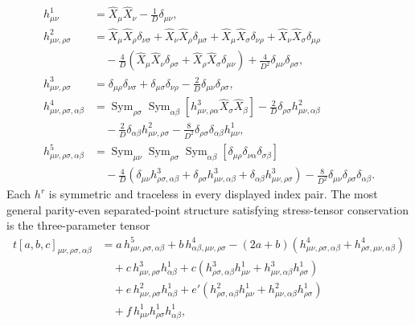 \begin{align}
  h^1_{\mu\nu}
  &=
  \widehat X_\mu\widehat X_\nu-\frac1D\delta_{\mu\nu},
  \nonumber\\
  h^2_{\mu\nu,\rho\sigma}
  &=
  \widehat X_\mu\widehat X_\rho\delta_{\nu\sigma}
  +\widehat X_\nu\widehat X_\rho\delta_{\mu\sigma}
  +\widehat X_\mu\widehat X_\sigma\delta_{\nu\rho}
  +\widehat X_\nu\widehat X_\sigma\delta_{\mu\rho}
  \nonumber\\
  &\quad
  -\frac4D
  \left(
    \widehat X_\mu\widehat X_\nu\delta_{\rho\sigma}
    +
    \widehat X_\rho\widehat X_\sigma\delta_{\mu\nu}
  \right)
  +
  \frac4{D^2}\delta_{\mu\nu}\delta_{\rho\sigma},
  \nonumber\\
  h^3_{\mu\nu,\rho\sigma}
  &=
  \delta_{\mu\rho}\delta_{\nu\sigma}
  +
  \delta_{\mu\sigma}\delta_{\nu\rho}
  -
  \frac2D\delta_{\mu\nu}\delta_{\rho\sigma},
  \nonumber\\
  h^4_{\mu\nu,\rho\sigma,\alpha\beta}
  &=
  \operatorname{Sym}_{\rho\sigma}
  \operatorname{Sym}_{\alpha\beta}
  \left[
    h^3_{\mu\nu,\rho\alpha}
    \widehat X_\sigma\widehat X_\beta
  \right]
  -
  \frac2D\delta_{\rho\sigma}h^2_{\mu\nu,\alpha\beta}
  \nonumber\\
  &\quad
  -
  \frac2D\delta_{\alpha\beta}h^2_{\mu\nu,\rho\sigma}
  -
  \frac8{D^2}\delta_{\rho\sigma}\delta_{\alpha\beta}h^1_{\mu\nu},
  \nonumber\\
  h^5_{\mu\nu,\rho\sigma,\alpha\beta}
  &=
  \operatorname{Sym}_{\mu\nu}
  \operatorname{Sym}_{\rho\sigma}
  \operatorname{Sym}_{\alpha\beta}
  \left[
    \delta_{\mu\rho}\delta_{\nu\alpha}\delta_{\sigma\beta}
  \right]
  \nonumber\\
  &\quad
  -
  \frac4D
  \left(
    \delta_{\mu\nu}h^3_{\rho\sigma,\alpha\beta}
    +
    \delta_{\rho\sigma}h^3_{\mu\nu,\alpha\beta}
    +
    \delta_{\alpha\beta}h^3_{\mu\nu,\rho\sigma}
  \right)
  -
  \frac8{D^2}
  \delta_{\mu\nu}\delta_{\rho\sigma}\delta_{\alpha\beta}.
  \label{eq:op-h-tensors}
\end{align}
Each \(h^r\) is symmetric and traceless in every displayed index pair.  The
most general parity-even separated-point structure satisfying stress-tensor
conservation is the three-parameter tensor
\begin{align}
  t[a,b,c]_{\mu\nu,\rho\sigma,\alpha\beta}
  &=
  a\,h^5_{\mu\nu,\rho\sigma,\alpha\beta}
  +
  b\,h^4_{\alpha\beta,\mu\nu,\rho\sigma}
  -
  (2a+b)
  \left(
    h^4_{\mu\nu,\rho\sigma,\alpha\beta}
    +
    h^4_{\rho\sigma,\mu\nu,\alpha\beta}
  \right)
  \nonumber\\
  &\quad
  +
  c\,h^3_{\mu\nu,\rho\sigma}h^1_{\alpha\beta}
  +
  c
  \left(
    h^3_{\rho\sigma,\alpha\beta}h^1_{\mu\nu}
    +
    h^3_{\mu\nu,\alpha\beta}h^1_{\rho\sigma}
  \right)
  \nonumber\\
  &\quad
  +
  e\,h^2_{\mu\nu,\rho\sigma}h^1_{\alpha\beta}
  +
  e'
  \left(
    h^2_{\rho\sigma,\alpha\beta}h^1_{\mu\nu}
    +
    h^2_{\mu\nu,\alpha\beta}h^1_{\rho\sigma}
  \right)
  \nonumber\\
  &\quad
  +
  f\,h^1_{\mu\nu}h^1_{\rho\sigma}h^1_{\alpha\beta},
  \label{eq:op-ttt-tensor}
\end{align}
